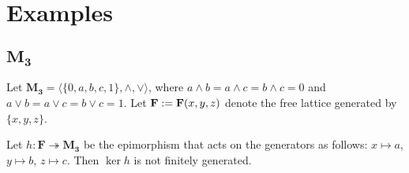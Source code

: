 \section{Examples}

\subsection{$\mathbf{M_3}$}

Let $\mathbf{M_3} = \langle \{0, a, b, c, 1\}, \wedge, \vee\rangle$, where $a \wedge b = a \wedge c = b \wedge c = 0$ and $a \vee b = a \vee c = b \vee c = 1.$ Let $\mathbf{F} := \mathbf{F}(x, y, z)$ denote the free lattice generated by $\{x, y, z\}$.

\begin{proposition}
Let $h\colon \mathbf{F} \twoheadrightarrow \mathbf{M_3}$ be the epimorphism that acts on the generators as follows: $x\mapsto a$, $y\mapsto b$, $z\mapsto c.$ Then $\operatorname{ker} h$ is not finitely generated.
\end{proposition}
